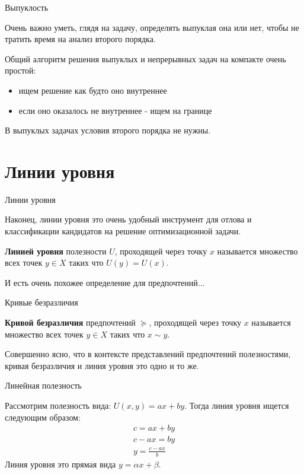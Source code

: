 \documentclass{beamer}
\begin{document}
\begin{frame}{Выпуклость}

Очень важно уметь, глядя на задачу, определять выпуклая она или нет, чтобы не тратить время на анализ второго порядка. 

Общий алгоритм решения выпуклых и непрерывных задач на компакте очень простой:

\begin{itemize}
\item ищем решение как будто оно внутреннее
\item если оно оказалось не внутреннее - ищем на границе
\end{itemize}

В выпуклых задачах условия второго порядка не нужны.

\end{frame}

\section{Линии уровня}

\begin{frame}{Линии уровня}

Наконец, линии уровня это очень удобный инструмент для отлова и классификации кандидатов на решение оптимизационной задачи.

\begin{definition}
\textbf{Линией уровня} полезности $U$, проходящей через точку $x$ называется множество всех точек $y \in X$ таких что $U(y) = U(x)$.
\end{definition}

И есть очень похожее определение для предпочтений...

\end{frame}

\begin{frame}{Кривые безразличия}

\begin{definition}
\textbf{Кривой безразличия} предпочтений $\succcurlyeq$, проходящей через точку $x$ называется множество всех точек $y \in X$ таких что $x \sim y$.
\end{definition}

Совершенно ясно, что в контексте представлений предпочтений полезностями, кривая безразличия и линия уровня это одно и то же.

\end{frame}

\begin{frame}{Линейная полезность}

Рассмотрим полезность вида: $U(x, y) = ax + by$. Тогда линия уровня ищется следующим образом: 
\begin{gather*}
c = ax + by\\
c-ax = by\\
y = \frac{c-ax}{b}
\end{gather*}
Линия уровня это прямая вида $y = \alpha x + \beta$.

\end{frame}
\end{document}
